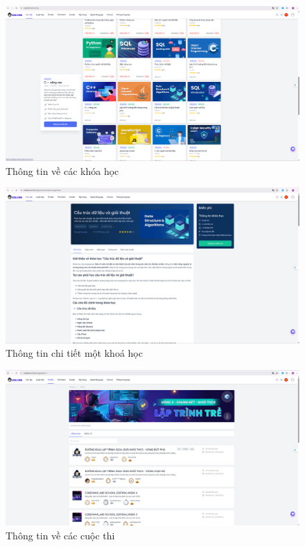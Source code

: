 \begin{figure}[!htp]
    \centering
    \includegraphics[width=1\linewidth]{picture/minh_chung_2.png}
    \caption{Thông tin về các khóa học}
\end{figure}

\begin{figure}[!htp]
    \centering
    \includegraphics[width=1\linewidth]{picture/minh_chung_3.png}
    \caption{Thông tin chi tiết một khoá học}
\end{figure}

\begin{figure}[!htp]
    \centering
    \includegraphics[width=1\linewidth]{picture/minh_chung_4.png}
    \caption{Thông tin về các cuộc thi}
\end{figure}

